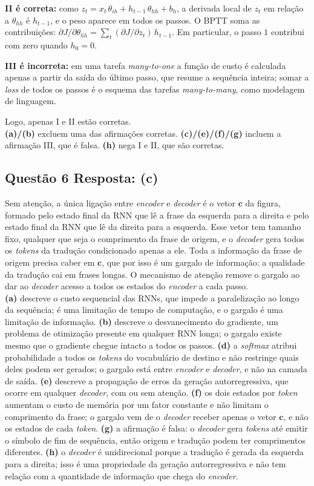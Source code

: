 \documentclass[11pt,a4paper]{article}
\begin{document}
\textbf{II é correta:} como $z_t = x_t\,\theta_{ih} + h_{t-1}\,\theta_{hh} + b_h$, a derivada local de $z_t$ em relação a $\theta_{hh}$ é $h_{t-1}$, e o peso aparece em todos os passos. O BPTT soma as contribuições: $\partial J / \partial \theta_{hh} = \sum_t (\partial J / \partial z_t)\, h_{t-1}$. Em particular, o passo $1$ contribui com zero quando $h_0 = 0$.

\textbf{III é incorreta:} em uma tarefa \textit{many-to-one} a função de custo é calculada apenas a partir da saída do último passo, que resume a sequência inteira; somar a \textit{loss} de todos os passos é o esquema das tarefas \textit{many-to-many}, como modelagem de linguagem.

Logo, apenas I e II estão corretas.\\
\textbf{(a)/(b)} excluem uma das afirmações corretas.
\textbf{(c)/(e)/(f)/(g)} incluem a afirmação III, que é falsa.
\textbf{(h)} nega I e II, que são corretas.

\subsection*{Questão 6 \textemdash{} Resposta: (c)}
Sem atenção, a única ligação entre \textit{encoder} e \textit{decoder} é o vetor $\mathbf{c}$ da figura, formado pelo estado final da RNN que lê a frase da esquerda para a direita e pelo estado final da RNN que lê da direita para a esquerda. Esse vetor tem tamanho fixo, qualquer que seja o comprimento da frase de origem, e o \textit{decoder} gera todos os \textit{tokens} da tradução condicionado apenas a ele. Toda a informação da frase de origem precisa caber em $\mathbf{c}$, que por isso é um gargalo de informação: a qualidade da tradução cai em frases longas. O mecanismo de atenção remove o gargalo ao dar ao \textit{decoder} acesso a todos os estados do \textit{encoder} a cada passo.\\
\textbf{(a)} descreve o custo sequencial das RNNs, que impede a paralelização ao longo da sequência; é uma limitação de tempo de computação, e o gargalo é uma limitação de informação.
\textbf{(b)} descreve o desvanecimento do gradiente, um problema de otimização presente em qualquer RNN longa; o gargalo existe mesmo que o gradiente chegue intacto a todos os passos.
\textbf{(d)} a \textit{softmax} atribui probabilidade a todos os \textit{tokens} do vocabulário de destino e não restringe quais deles podem ser gerados; o gargalo está entre \textit{encoder} e \textit{decoder}, e não na camada de saída.
\textbf{(e)} descreve a propagação de erros da geração autorregressiva, que ocorre em qualquer \textit{decoder}, com ou sem atenção.
\textbf{(f)} os dois estados por \textit{token} aumentam o custo de memória por um fator constante e não limitam o comprimento da frase; o gargalo vem de o \textit{decoder} receber apenas o vetor $\mathbf{c}$, e não os estados de cada \textit{token}.
\textbf{(g)} a afirmação é falsa: o \textit{decoder} gera \textit{tokens} até emitir o símbolo de fim de sequência, então origem e tradução podem ter comprimentos diferentes.
\textbf{(h)} o \textit{decoder} é unidirecional porque a tradução é gerada da esquerda para a direita; isso é uma propriedade da geração autorregressiva e não tem relação com a quantidade de informação que chega do \textit{encoder}.
\end{document}
